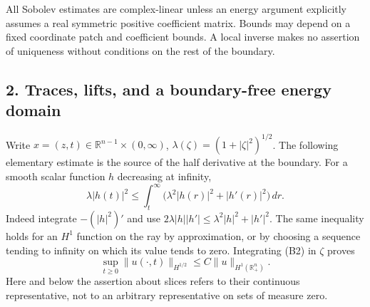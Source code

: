 \documentclass[
  11pt,
]{article}
\makeatletter
\let\ReaderOriginalAnchorStart\hyper@anchorstart
\let\ReaderOriginalAnchorEnd\hyper@anchorend
\let\ReaderPendingAliases\@empty
\def\ReaderArmAliases#1{\gdef\ReaderPendingAliases{#1}}
\def\hyper@anchorstart#1{\ReaderIfNativeAnchorTF{#1}{\ReaderPendingAliases\global\let\ReaderPendingAliases\@empty}{}\ReaderOriginalAnchorStart{#1}}
\makeatother
\begin{document}
All Sobolev estimates are complex-linear unless an energy argument
explicitly assumes a real symmetric positive coefficient matrix. Bounds
may depend on a fixed coordinate patch and coefficient bounds. A local
inverse makes no assertion of uniqueness without conditions on the rest
of the boundary.

\ReaderArmAliases{\ReaderOriginalAnchorStart{AN03-SBD-002}\ReaderOriginalAnchorEnd\begingroup\expandafter\def\csname @currentHref\endcsname{AN03-SBD-002}\label{AN03-SBD-002}\endgroup\ReaderOriginalAnchorStart{an03-sbd-002-traces-lifts-and-a-boundary-free-energy-domain}\ReaderOriginalAnchorEnd\begingroup\expandafter\def\csname @currentHref\endcsname{an03-sbd-002-traces-lifts-and-a-boundary-free-energy-domain}\label{an03-sbd-002-traces-lifts-and-a-boundary-free-energy-domain}\endgroup\ReaderOriginalAnchorStart{2-traces-lifts-and-a-boundary-free-energy-domain}\ReaderOriginalAnchorEnd\begingroup\expandafter\def\csname @currentHref\endcsname{2-traces-lifts-and-a-boundary-free-energy-domain}\label{2-traces-lifts-and-a-boundary-free-energy-domain}\endgroup\ReaderOriginalAnchorStart{traces-lifts-and-a-boundary-free-energy-domain}\ReaderOriginalAnchorEnd}
\subsection{2. Traces, lifts, and a boundary-free energy
domain}\label{traces-lifts-and-a-boundary-free-energy-domain}

Write \(x=(z,t)\in\mathbb R^{n-1}\times(0,\infty)\),
\(\lambda(\zeta)=(1+|\zeta|^2)^{1/2}\). The following elementary
estimate is the source of the half derivative at the boundary. For a
smooth scalar function \(h\) decreasing at infinity, \[
 \lambda |h(t)|^2
 \leq\int_t^\infty\bigl(\lambda^2|h(r)|^2+|h'(r)|^2\bigr)\,dr. \tag{B2}
\] Indeed integrate \(-(|h|^2)'\) and use
\(2\lambda |h||h'|\leq\lambda^2|h|^2+|h'|^2\). The same inequality holds
for an \(H^1\) function on the ray by approximation, or by choosing a
sequence tending to infinity on which its value tends to zero.
Integrating (B2) in \(\zeta\) proves \[
 \sup_{t\geq0}\|u(\cdot,t)\|_{H^{1/2}}\leq C\|u\|_{H^1(\mathbb R^n_+)}. \tag{B3}
\] Here and below the assertion about slices refers to their continuous
representative, not to an arbitrary representative on sets of measure
zero.
\end{document}
